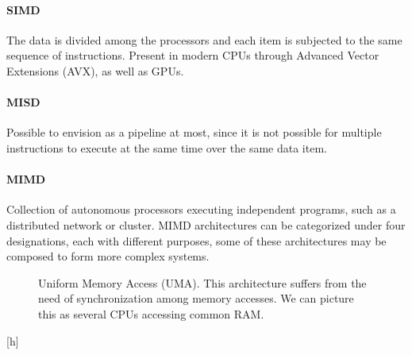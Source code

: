 \paragraph{SIMD}
The data is divided among the processors and each item is subjected to the same sequence of instructions. Present in modern CPUs through Advanced Vector Extensions (AVX), as well as GPUs.


\paragraph{MISD}
Possible to envision as a pipeline at most, since it is not possible for multiple instructions to execute at the same time over the same data item.

\paragraph{MIMD}
Collection of autonomous processors executing independent programs, such as a distributed network or cluster.
MIMD architectures can be categorized under four designations, each with different purposes, some of these architectures may be composed to form more complex systems.

\begin{figure}[h]
    \centering
    \caption{Uniform Memory Access (UMA). This architecture suffers from the need of synchronization among memory accesses. We can picture this as several CPUs accessing common RAM.}
    \label{fig:sm:uma}
\end{figure}[h]


